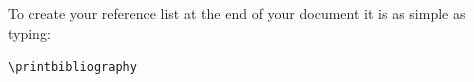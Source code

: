 \documentclass[a4paper,12pt]{article}
\begin{document}
To create your reference list at the end of your document it is as simple as typing: 
\begin{lstlisting}
\printbibliography
\end{lstlisting} 


\printbibliography
\appendix
\renewcommand{\thefigure}{\thesection.\arabic{figure}}
\renewcommand{\thetable}{\thesection.\arabic{table}}
\renewcommand{\thepage}{\thesection.\arabic{page}}
\end{document}
